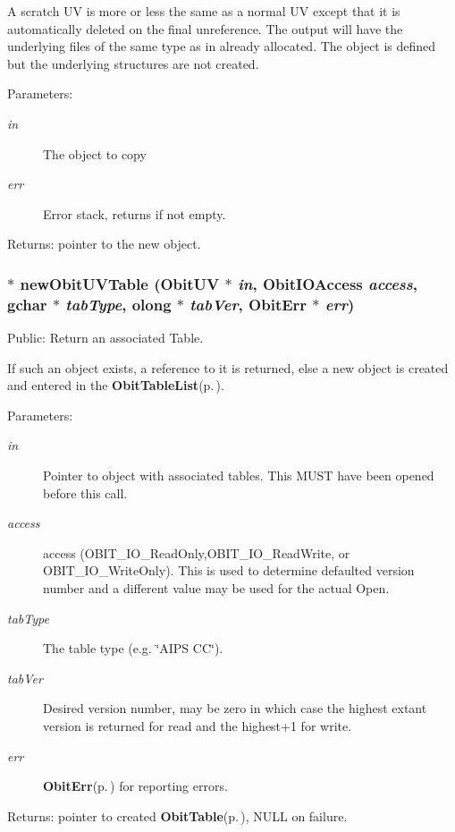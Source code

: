 A scratch UV is more or less the same as a normal UV except that it is automatically deleted on the final unreference. The output will have the underlying files of the same type as in already allocated. The object is defined but the underlying structures are not created. \begin{Desc}
\item[Parameters:]
\begin{description}
\item[{\em in}]The object to copy \item[{\em err}]Error stack, returns if not empty. \end{description}
\end{Desc}
\begin{Desc}
\item[Returns:]pointer to the new object. \end{Desc}
\subsubsection{$\ast$ new\-Obit\-UVTable ({\bf Obit\-UV} $\ast$ {\em in}, Obit\-IOAccess {\em access}, gchar $\ast$ {\em tab\-Type}, {\bf olong} $\ast$ {\em tab\-Ver}, {\bf Obit\-Err} $\ast$ {\em err})}\label{ObitUV_8h_a45}


Public: Return an associated Table. 

If such an object exists, a reference to it is returned, else a new object is created and entered in the {\bf Obit\-Table\-List}{\rm (p.\,\pageref{structObitTableList})}. \begin{Desc}
\item[Parameters:]
\begin{description}
\item[{\em in}]Pointer to object with associated tables. This MUST have been opened before this call. \item[{\em access}]access (OBIT\_\-IO\_\-Read\-Only,OBIT\_\-IO\_\-Read\-Write, or OBIT\_\-IO\_\-Write\-Only). This is used to determine defaulted version number and a different value may be used for the actual Open. \item[{\em tab\-Type}]The table type (e.g. \char`\"{}AIPS CC\char`\"{}). \item[{\em tab\-Ver}]Desired version number, may be zero in which case the highest extant version is returned for read and the highest+1 for write. \item[{\em err}]{\bf Obit\-Err}{\rm (p.\,\pageref{structObitErr})} for reporting errors. \end{description}
\end{Desc}
\begin{Desc}
\item[Returns:]pointer to created {\bf Obit\-Table}{\rm (p.\,\pageref{structObitTable})}, NULL on failure. \end{Desc}
